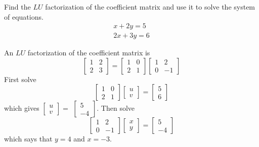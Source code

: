 \documentclass{ximera}
\begin{document}
\begin{problem}\label{prb:4.70} Find the $LU$ factorization of the coefficient matrix and use it to solve the system of equations.
\begin{equation*}
\begin{array}{c}
x+2y=5 \\
2x+3y=6
\end{array}
\end{equation*}
\begin{hint}
An $LU$ factorization of the coefficient matrix is
\[
\left[
\begin{array}{cc}
1 & 2 \\
2 & 3
\end{array}
\right] =  \left[
\begin{array}{cc}
1 & 0 \\
2 & 1
\end{array}
\right] \left[
\begin{array}{cc}
1 & 2 \\
0 & -1
\end{array}
\right]
\]
First solve
\[
\left[
\begin{array}{cc}
1 & 0 \\
2 & 1
\end{array}
\right] \left[
\begin{array}{c}
u \\
v
\end{array}
\right] =\left[
\begin{array}{c}
5 \\
6
\end{array}
\right]
\]
which gives $\left[
\begin{array}{c}
u \\
v
\end{array}
\right] =$ $\left[
\begin{array}{r}
5 \\
-4
\end{array}
\right] .$ Then solve
\[
\left[
\begin{array}{rr}
1 & 2 \\
0 & -1
\end{array}
\right] \left[
\begin{array}{c}
x \\
y
\end{array}
\right] =\left[
\begin{array}{r}
5 \\
-4
\end{array}
\right]
\]
which says that $y=4$ and $x=-3.$
\end{hint}
\end{problem}
\end{document}
